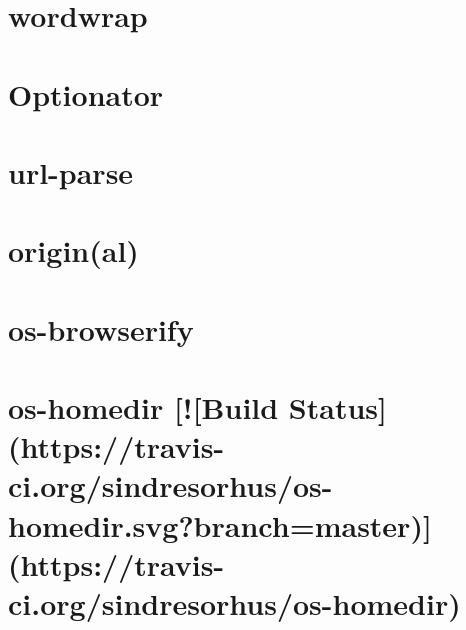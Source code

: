 \documentclass[twoside]{book}
\newcommand{\+}{\discretionary{\mbox{\scriptsize$\hookleftarrow$}}{}{}}
\begin{document}
\chapter{wordwrap}
\label{md__c_1_workspace_demo_src_main_script_node_modules_optionator_node_modules_wordwrap__r_e_a_d_m_e}

\chapter{Optionator}
\label{md__c_1_workspace_demo_src_main_script_node_modules_optionator__r_e_a_d_m_e}

\chapter{url-\/parse}
\label{md__c_1_workspace_demo_src_main_script_node_modules_original_node_modules_url-parse__r_e_a_d_m_e}

\chapter{origin(al)}
\label{md__c_1_workspace_demo_src_main_script_node_modules_original__r_e_a_d_m_e}

\chapter{os-\/browserify}
\label{md__c_1_workspace_demo_src_main_script_node_modules_os-browserify__r_e_a_d_m_e}

\chapter{os-\/homedir \mbox{[}!\mbox{[}Build Status\mbox{]}(https\+://travis-\/ci.org/sindresorhus/os-\/homedir.svg?branch=master)\mbox{]}(https\+://travis-\/ci.org/sindresorhus/os-\/homedir)}
\label{md__c_1_workspace_demo_src_main_script_node_modules_os-homedir_readme}

\end{document}
